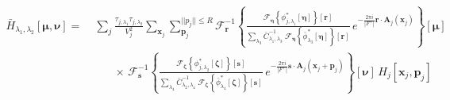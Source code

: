 \documentclass[DM,authoryear,toc]{lsstdoc}
\begin{document}
\begin{align}
    \bar{H}_{\lambda_1,\lambda_2}[\bm{\mu},\bm{\nu}]
    =&\;
    \sum_j
    \frac{\tau_{j,\lambda_1}\tau_{j,\lambda_2}}{V_j^2}
    \sum_{\bm{x}_j}
    \!\!\!\!
    \sum_{\bm{p}_j}^{||p_j|| \le R}
    \!\!
        \mathcal{F}^{-1}_{\bm{r}}\!\left\{
            \frac{
                \mathcal{F}_{\bm{\eta}}\!\left\{
                \phi^*_{j,\lambda_1}\!\left[
                    \bm{\eta}
                \right]
                \right\}\!\left[
                    \bm{r}
                \right]
            }{
                \sum\limits_{\lambda_3}
                \bar{C}_{\lambda_1,\lambda_3}^{-1}
                \;
                \mathcal{F}_{\bm{\eta}}\!\left\{
                    \bar{\phi}^*_{\lambda_3}[\bm{\eta}]
                \right\}\!\left[
                    \bm{r}
                \right]
            }
            \,
            e^{-\frac{2\pi i}{|F^+|}\bm{r}\cdot\bm{A}_j(\bm{x}_j)}
        \right\}\!\left[
            \bm{\mu}
        \right]
    \\
    &\qquad\times
        \,
        \mathcal{F}^{-1}_{\bm{s}}\!\left\{
            \frac{
                \mathcal{F}_{\bm{\zeta}}\!\left\{
                \phi^*_{j,\lambda_2}\!\left[
                    \bm{\zeta}
                \right]
                \right\}\!\left[
                    \bm{s}
                \right]
            }{
                \sum\limits_{\lambda_4}
                \bar{C}_{\lambda_2,\lambda_4}^{-1}
                \;
                \mathcal{F}_{\bm{\zeta}}\!\left\{
                    \bar{\phi}^*_{\lambda_4}[\bm{\zeta}]
                \right\}\!\left[
                    \bm{s}
                \right]
            }
            \,
            e^{-\frac{2\pi i}{|F^+|}\bm{s}\cdot\bm{A}_j(\bm{x}_j+\bm{p}_j)}
        \right\}\!\left[
            \bm{\nu}
        \right]
    \,
    H_j[\bm{x}_j, \bm{p}_j]
\end{align}
\end{document}
